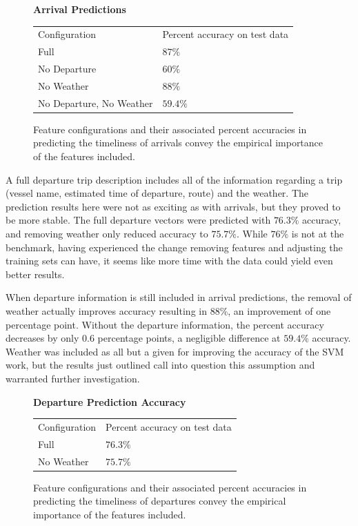 \documentclass[11pt]{article} %
\begin{document}
\begin{figure}
    \centering
    \textbf{Arrival Predictions}

    \begin{tabular}{ll}
        Configuration & Percent accuracy on test data\\
        Full          & $87\%$\\
        No Departure  & $60\%$\\
        No Weather    & $88\%$\\
        No Departure, No Weather  & $59.4\%$\\
    \end{tabular}
    \caption{Feature configurations and their associated percent accuracies in
         predicting the timeliness of arrivals convey the empirical importance of 
         the features included.}
    \label{fig:second_run_data_arrivals}
\end{figure}

A full departure trip description includes all of the information regarding a trip
(vessel name, estimated time of departure, route) and the weather. 
The prediction results here were not
as exciting as with arrivals, but they proved to be more stable. The full 
departure vectors were predicted with $76.3\%$ accuracy, and removing weather
only reduced accuracy to $75.7\%$. While $76\%$ is not at the benchmark, having
experienced the change removing features and adjusting the training sets can have,
it seems like more time with the data could yield even better results.

When departure information is still included in arrival predictions, the removal of 
weather actually improves accuracy resulting in $88\%$, an improvement of one
percentage point. Without the departure information, the percent accuracy decreases
by only $0.6$ percentage points, a negligible difference at $59.4\%$ accuracy. 
Weather was included as all but a given for improving the accuracy of the SVM
work, but the results just outlined call into question this assumption and 
warranted further investigation.

\begin{figure}
    \centering
    \textbf{Departure Prediction Accuracy}

    \begin{tabular}{ll}
        Configuration & Percent accuracy on test data\\
        Full        & $76.3\%$\\
        No Weather  & $75.7\%$\\
    \end{tabular}
    \caption{Feature configurations and their associated percent accuracies in
         predicting the timeliness of departures convey the empirical importance of 
         the features included.}
    \label{fig:second_run_data_departures}
\end{figure}
\end{document}
